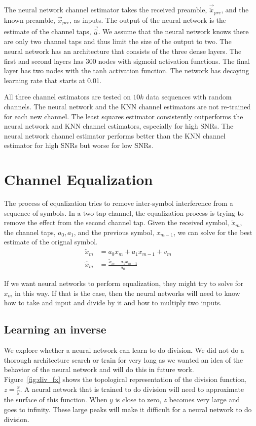 The neural network channel estimator takes the received preamble, $\vec{\tilde{x}}_{pre}$, and the known preamble, $\vec{x}_{pre}$, as inputs.
The output of the neural network is the estimate of the channel taps, $\vec{\hat{a}}$.  We assume that the neural network knows there are only two channel taps and thus limit the size of the output to two.
The neural network has an architecture that consists of the three dense layers.  
The first and second layers has $300$ nodes with sigmoid activation functions.  The final layer has two nodes with the tanh activation function.  The network has decaying learning rate that starts at 0.01.

All three channel estimators are tested on $10k$ data sequences with random channels.  The neural network and the KNN channel estimators are not re-trained for each new channel.  The least squares estimator consistently outperforms the neural network and KNN channel estimators, especially for high SNRs.
The neural network channel estimator performs better than the KNN channel estimator for high SNRs but worse for low SNRs.


\section{Channel Equalization}

The process of equalization tries to remove inter-symbol interference from a sequence of symbols.  
In a two tap channel, the equalization process is trying to remove the effect from the second channel tap.  Given the received symbol, $\tilde{x}_m$, the channel taps, $a_0, a_1$, and the previous symbol, $x_{m-1}$, we can solve for the best estimate of the orignal symbol.
\begin{align}
\tilde{x}_m &= a_0 x_{m} + a_1 x_{m-1} + v_m\\
\hat{x}_m &= \frac{\tilde{x}_m - a_1 x_{m-1}}{a_0}
\end{align}

If we want neural networks to perform equalization, they might try to solve for $\hat{x}_m$ in this way.  
If that is the case, then the neural networks will need to know how to take and input and divide by it and how to multiply two inputs.  

\subsection{Learning an inverse}

We explore whether a neural network can learn to do division.  We did not do a thorough architecture search or train for very long as we wanted an idea of the behavior of the neural network and will do this in future work.  
Figure~\ref{fig:div_fx} shows the topological representation of the division function, $z=\frac{x}{y}$.  A neural network that is trained to do division will need to approximate the surface of this function.  
When $y$ is close to zero, $z$ becomes very large and goes to infinity.  These large peaks will make it difficult for a neural network to do division.  

